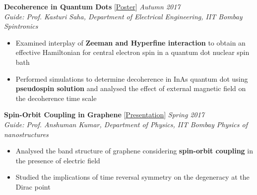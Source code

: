 \documentclass[10pt]{article}%
\newcommand{\xfilll}[2][1ex]{
\dimen0=#2\advance\dimen0 by #1
\leaders\hrule height \dimen0 depth -#1\hfill}
\begin{document}
{
\vspace{-3mm}
{\flushleft \bf \large{Decoherence in Quantum Dots}} [\href{https://drive.google.com/open?id=1v11CH0DM8BUDSKs3WMak44_N4ih1-Pgx}{Poster}]  \hfill \textit{Autumn 2017} \\
{\em Guide: Prof. Kasturi Saha, Department of Electrical Engineering, IIT Bombay \hfill Spintronics}
\vspace{-1.5mm}
\begin{itemize}
\setlength\itemsep{0.01em}
   \item    Examined interplay of \textbf{Zeeman and Hyperfine interaction} to obtain an effective Hamiltonian for central electron spin in a quantum dot nuclear spin bath
    \item   Performed simulations to determine decoherence in InAs quantum dot using \textbf{pseudospin solution} and analysed the effect of external magnetic field on the decoherence time scale 
\end{itemize}



{\flushleft \bf \large{Spin-Orbit Coupling in Graphene}} [\href{https://drive.google.com/open?id=10kLKzByDk3SRPMNvV2lMFP8mvrTM7Esq}{Presentation}]  \hfill \textit{Spring 2017}\\
{\em Guide: Prof. Anshuman Kumar, Department of Physics, IIT Bombay \hfill Physics of nanostructures}
\vspace{-1.5mm}
\begin{itemize}
\setlength\itemsep{0.01em}
    \item Analysed the band structure of graphene considering \textbf{spin-orbit coupling} in the presence of  electric field
    \item Studied the implications of time reversal symmetry on the degeneracy at the Dirac point
\end{itemize}

}
\end{document}
